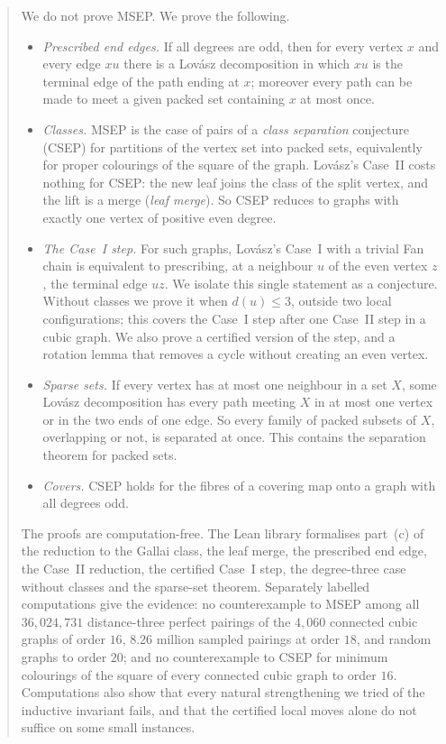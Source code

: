 \documentclass[11pt]{amsart}
\theoremstyle{definition}
\begin{document}
\begin{abstract}
We do not prove MSEP. We prove the following.
\begin{itemize}
\item \emph{Prescribed end edges.} If all degrees are odd, then for every vertex $x$ and every edge
$xu$ there is a Lov\'asz decomposition in which $xu$ is the terminal edge of the path ending at $x$;
moreover every path can be made to meet a given packed set containing $x$ at most once.
\item \emph{Classes.} MSEP is the case of pairs of a \emph{class separation} conjecture (CSEP) for
partitions of the vertex set into packed sets, equivalently for proper colourings of the square of
the graph. Lov\'asz's Case~II costs nothing for CSEP: the new leaf joins the class of the split
vertex, and the lift is a merge (\emph{leaf merge}). So CSEP reduces to graphs with exactly one
vertex of positive even degree.
\item \emph{The Case~I step.} For such graphs, Lov\'asz's Case~I with a trivial Fan chain is
equivalent to prescribing, at a neighbour $u$ of the even vertex $z$, the terminal edge $uz$. We
isolate this single statement as a conjecture. Without classes we prove it when $d(u)\le3$, outside two
local configurations; this covers the Case~I step after one Case~II step in a cubic graph. We also prove
a certified version of the step, and a rotation lemma that removes a cycle without creating an even
vertex.
\item \emph{Sparse sets.} If every vertex has at most one neighbour in a set $X$, some Lov\'asz
decomposition has every path meeting $X$ in at most one vertex or in the two ends of one edge. So
every family of packed subsets of $X$, overlapping or not, is separated at once. This contains the
separation theorem for packed sets.
\item \emph{Covers.} CSEP holds for the fibres of a covering map onto a graph with all degrees odd.
\end{itemize}
The proofs are computation-free. The Lean library formalises part~(c) of the reduction to the Gallai
class, the leaf merge, the prescribed end edge, the Case~II reduction, the certified Case~I step, the degree-three case without
classes and the sparse-set theorem. Separately labelled
computations give the evidence: no counterexample to MSEP among all $36{,}024{,}731$ distance-three
perfect pairings of the $4{,}060$ connected cubic graphs of order $16$, $8.26$ million sampled
pairings at order $18$, and random graphs to order $20$; and no counterexample to CSEP for minimum
colourings of the square of every connected cubic graph to order $16$. Computations also show that
every natural strengthening we tried of the inductive invariant fails, and that the certified local
moves alone do not suffice on some small instances.
\end{abstract}
\maketitle
\end{document}
